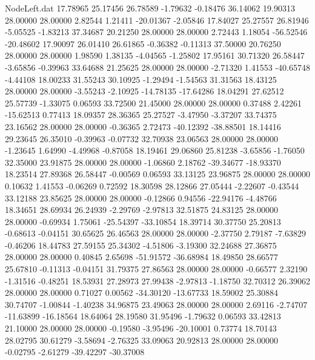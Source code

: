 \begin{filecontents}{NodeLeft.dat}
  17.78965   25.17456   26.78589    -1.79632   -0.18476   36.14062   19.90313   28.00000   28.00000    2.82544    1.21411  -20.01367   -2.05846
  17.84027   25.27557   26.81946    -5.05525   -1.83213   37.34687   20.21250   28.00000   28.00000    2.72443    1.18054  -56.52546  -20.48602
  17.90097   26.01410   26.61865    -0.36382   -0.11313   37.50000   20.76250   28.00000   28.00000    1.98590    1.38135   -4.04565   -1.25802
  17.95161   30.71320   26.58447    -3.65856   -0.39963   33.64688   21.25625   28.00000   28.00000   -2.71320    1.41553  -40.65748   -4.44108
  18.00233   31.55243   30.10925    -1.29494   -1.54563   31.31563   18.43125   28.00000   28.00000   -3.55243   -2.10925  -14.78135  -17.64286
  18.04291   27.62512   25.57739    -1.33075    0.06593   33.72500   21.45000   28.00000   28.00000    0.37488    2.42261  -15.62513    0.77413
  18.09357   28.36365   25.27527    -3.47950   -3.37207   33.74375   23.16562   28.00000   28.00000   -0.36365    2.72473  -40.12392  -38.88501
  18.14416   29.23645   26.35010    -0.39963   -0.07732   32.70938   23.06563   28.00000   28.00000   -1.23645    1.64990   -4.49968   -0.87058
  18.19461   29.06860   25.81238    -3.65856   -1.76050   32.35000   23.91875   28.00000   28.00000   -1.06860    2.18762  -39.34677  -18.93370
  18.23514   27.89368   26.58447    -0.00569    0.06593   33.13125   23.96875   28.00000   28.00000    0.10632    1.41553   -0.06269    0.72592
  18.30598   28.12866   27.05444    -2.22607   -0.43544   33.12188   23.85625   28.00000   28.00000   -0.12866    0.94556  -22.94176   -4.48766
  18.34651   28.69934   26.24939    -2.29769   -2.97813   32.51875   24.83125   28.00000   28.00000   -0.69934    1.75061  -25.54397  -33.10854
  18.39714   30.37750   25.20813    -0.68613   -0.04151   30.65625   26.46563   28.00000   28.00000   -2.37750    2.79187   -7.63829   -0.46206
  18.44783   27.59155   25.34302    -4.51806   -3.19300   32.24688   27.36875   28.00000   28.00000    0.40845    2.65698  -51.91572  -36.68984
  18.49850   28.66577   25.67810    -0.11313   -0.04151   31.79375   27.86563   28.00000   28.00000   -0.66577    2.32190   -1.31516   -0.48251
  18.53931   27.28973   27.99438    -2.97813   -1.18750   32.70312   26.39062   28.00000   28.00000    0.71027    0.00562  -34.30120  -13.67733
  18.59002   25.30884   30.74707    -1.00844   -1.40238   34.96875   23.49063   28.00000   28.00000    2.69116   -2.74707  -11.63899  -16.18564
  18.64064   28.19580   31.95496    -1.79632    0.06593   33.42813   21.10000   28.00000   28.00000   -0.19580   -3.95496  -20.10001    0.73774
  18.70143   28.02795   30.61279    -3.58694   -2.76325   33.09063   20.92813   28.00000   28.00000   -0.02795   -2.61279  -39.42297  -30.37008

\end{filecontents}
